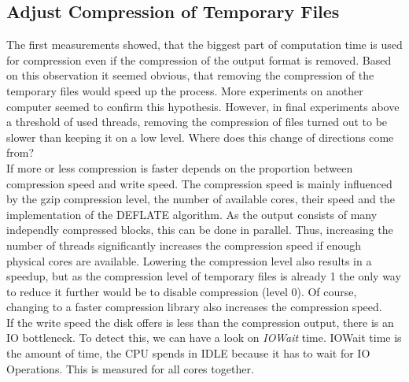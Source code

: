 \subsection{Adjust Compression of Temporary Files}
The first measurements showed, that the biggest part of computation time is used for compression even if the compression of the output format is removed. Based on this observation it seemed obvious, that removing the compression of the temporary files would speed up the process. More experiments on another computer seemed to confirm this hypothesis. However, in final experiments above a threshold of used threads, removing the compression of files turned out to be slower than keeping it on a low level. Where does this change of directions come from? \\
If more or less compression is faster depends on the proportion between compression speed and write speed. The compression speed is mainly influenced by the gzip compression level, the number of available cores, their speed and the implementation of the DEFLATE algorithm. As the output consists of many independly compressed blocks, this can be done in parallel. Thus, increasing the number of threads significantly increases the compression speed if enough physical cores are available. Lowering the compression level also results in a speedup, but as the compression level of temporary files is already 1 the only way to reduce it further would be to disable compression (level 0). Of course, changing to a faster compression library also increases the compression speed. \\
If the write speed the disk offers is less than the compression output, there is an IO bottleneck. To detect this, we can have a look on \textit{IOWait} time. IOWait time is the amount of time, the CPU spends in IDLE because it has to wait for IO Operations. This is measured for all cores together. 
